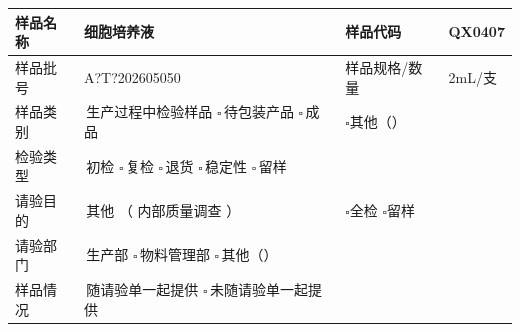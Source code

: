 \documentclass[UTF8,10pt,a4paper,fontset=fandol]{ctexart}
\renewcommand{\arraystretch}{1.15}
\newcommand{\fieldvalue}[1]{#1}
\newcommand{\handwritten}[1]{#1}
\begin{document}
\renewcommand{\arraystretch}{1.35}
\small
\begin{tabularx}{\textwidth}{|p{2.6cm}|X|p{2.6cm}|X|}
\hline
样品名称 &
\fieldvalue{\handwritten{细胞培养液}} &
样品代码 &
\fieldvalue{\handwritten{QX0407}}
\\ \hline

样品批号 &
\fieldvalue{\handwritten{A?T?202605050}} &
样品规格/数量 &
\fieldvalue{\handwritten{2mL/支}}
\\ \hline

样品类别 &
\fieldvalue{\handwritten{\checkmark}\,生产过程中检验样品}
\quad \(\square\)\,待包装产品
\quad \(\square\)\,成品
&
\multicolumn{2}{l|}{\(\square\)其他（\hspace{2cm}）}
\\ \hline

检验类型 &
\fieldvalue{\handwritten{\checkmark}\,初检}
\quad \(\square\)\,复检
\quad \(\square\)\,退货
\quad \(\square\)\,稳定性
\quad \(\square\)\,留样
&
\multicolumn{2}{l|}{}
\\ \hline

请验目的 &
\fieldvalue{\handwritten{\checkmark}\,其他}
（
\fieldvalue{\handwritten{内部质量调查}}
）
&
\multicolumn{2}{l|}{\(\square\)全检 \quad \(\square\)留样}
\\ \hline

请验部门 &
\fieldvalue{\handwritten{\checkmark}\,生产部}
\quad \(\square\)\,物料管理部
\quad \(\square\)\,其他（\hspace{1.5cm}）
&
\multicolumn{2}{l|}{}
\\ \hline

样品情况 &
\fieldvalue{\handwritten{\checkmark}\,随请验单一起提供}
\quad \(\square\)\,未随请验单一起提供
&
\multicolumn{2}{l|}{}
\\ \hline


\end{tabularx}
\end{document}

